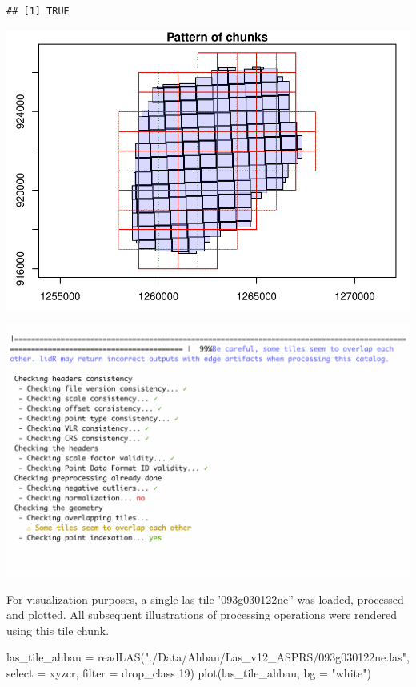 \documentclass[
]{article}
\newenvironment{Shaded}{\begin{snugshade}}{\end{snugshade}}
\newcommand{\AttributeTok}[1]{\textcolor[rgb]{0.77,0.63,0.00}{#1}}
\newcommand{\FunctionTok}[1]{\textcolor[rgb]{0.00,0.00,0.00}{#1}}
\newcommand{\NormalTok}[1]{#1}
\newcommand{\OtherTok}[1]{\textcolor[rgb]{0.56,0.35,0.01}{#1}}
\newcommand{\StringTok}[1]{\textcolor[rgb]{0.31,0.60,0.02}{#1}}
\begin{document}
\begin{verbatim}
## [1] TRUE
\end{verbatim}

\includegraphics{13_lidR_PointCloud_Processing_files/figure-latex/unnamed-chunk-4-1.pdf}

\includegraphics{13_lidR_PointCloud_Processing_files/markdown_pngs/tas_ctg_check.png}

For visualization purposes, a single las tile '093g030122ne'' was
loaded, processed and plotted. All subsequent illustrations of
processing operations were rendered using this tile chunk.

\begin{Shaded}
\begin{Highlighting}[]
\NormalTok{las\_tile\_ahbau }\OtherTok{=} \FunctionTok{readLAS}\NormalTok{(}\StringTok{"./Data/Ahbau/Las\_v12\_ASPRS/093g030122ne.las"}\NormalTok{, }\AttributeTok{select =} \StringTok{\textquotesingle{}xyzcr\textquotesingle{}}\NormalTok{, }\AttributeTok{filter =} \StringTok{\textquotesingle{}{-}drop\_class 19\textquotesingle{}}\NormalTok{)}
\FunctionTok{plot}\NormalTok{(las\_tile\_ahbau, }\AttributeTok{bg =} \StringTok{"white"}\NormalTok{)}
\end{Highlighting}
\end{Shaded}
\end{document}
